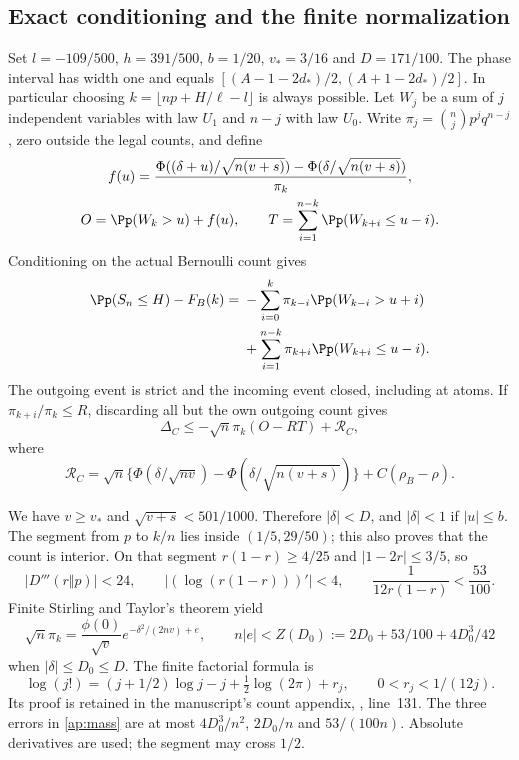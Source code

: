 \subsection{Exact conditioning and the finite normalization}
Set $l=-109/500$, $h=391/500$, $b=1/20$, $v_*=3/16$ and $D=171/100$.
The phase interval has width one and equals
$[(A-1-2d_*)/2,(A+1-2d_*)/2]$. In particular choosing
$k=\lfloor np+H/\ell-l\rfloor$ is always possible.
Let $W_j$ be a sum of $j$ independent variables with law $U_1$ and
$n-j$ with law $U_0$. Write $\pi_j=\binom njp^jq^{n-j}$, zero outside
the legal counts, and define
\[
 \begin{gathered}
 f(u)=\frac{\Phi((\delta+u)/\sqrt{n(v+s)})-
                  \Phi(\delta/\sqrt{n(v+s)})}{\pi_k},\\
 O=\Pp(W_k>u)+f(u),\qquad
 T=\sum_{i=1}^{n-k}\Pp(W_{k+i}\le u-i).
 \end{gathered}
\]
Conditioning on the actual Bernoulli count gives
\begin{align*}
 \Pp(S_n\le H)-F_B(k)
 ={}&-\sum_{i=0}^k\pi_{k-i}\Pp(W_{k-i}>u+i)\\
 &+\sum_{i=1}^{n-k}\pi_{k+i}\Pp(W_{k+i}\le u-i).
\end{align*}
The outgoing event is strict and the incoming event closed, including at
atoms. If $\pi_{k+i}/\pi_k\le R$, discarding all but the own outgoing
count gives
\begin{equation}\label{ap:master}
 \Delta_C\le-\sqrt n\pi_k(O-RT)+\mathcal R_C,
\end{equation}
where
\[
 \mathcal R_C=\sqrt n\{\Phi(\delta/\sqrt{nv})-
                    \Phi(\delta/\sqrt{n(v+s)})\}+C(\rho_B-\rho).
\]

We have $v\ge v_*$ and $\sqrt{v+s}<501/1000$. Therefore
$|\delta|<D$, and $|\delta|<1$ if $|u|\le b$. The segment from $p$
to $k/n$ lies inside $(1/5,29/50)$; this also proves that the count is
interior. On that segment $r(1-r)\ge4/25$ and $|1-2r|\le3/5$, so
\[
 |D'''(r\Vert p)|<24,\qquad
 |(\log(r(1-r)))'|<4,\qquad
 \frac1{12r(1-r)}<\frac{53}{100}.
\]
Finite Stirling and Taylor's theorem yield
\begin{equation}\label{ap:mass}
 \sqrt n\pi_k=\frac{\phi(0)}{\sqrt v}
       e^{-\delta^2/(2nv)+e},\qquad
 n|e|<Z(D_0):=2D_0+53/100+4D_0^3/42
\end{equation}
when $|\delta|\le D_0\le D$. The finite factorial formula is
\[
 \log(j!)=(j+1/2)\log j-j+\tfrac12\log(2\pi)+r_j,
 \qquad 0<r_j<1/(12j).
\]
Its proof is retained in the manuscript's count appendix,
, line~131. The three errors in
\eqref{ap:mass} are at most $4D_0^3/n^2$, $2D_0/n$ and $53/(100n)$.
Absolute derivatives are used; the segment may cross $1/2$.

